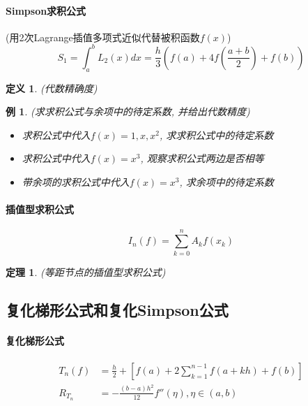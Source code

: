\documentclass[twoside]{article}
\newtheorem{theorem}{定理}[section]
\newtheorem{definition}{定义}[section]
\newtheorem{eg}{例}[section]
\begin{document}
\paragraph{Simpson求积公式}
(用2次Lagrange插值多项式近似代替被积函数$f(x)$)
\begin{equation}
  S_1 = \int^b_a L_2(x)dx = \frac{h}{3} \left(f(a) + 4f(\frac{a+b}{2}) + f(b) \right)
\end{equation}
\begin{definition}
  (代数精确度)
\end{definition}
\begin{eg}
  (求求积公式与余项中的待定系数, 并给出代数精度)
  \begin{itemize}
    \item 求积公式中代入$f(x)=1, x, x^2$, 求求积公式中的待定系数
    \item 求积公式中代入$f(x)=x^3$, 观察求积公式两边是否相等
    \item 带余项的求积公式中代入$f(x)=x^3$, 求余项中的待定系数
  \end{itemize}
\end{eg}
\paragraph{插值型求积公式}
\begin{equation}
  I_n(f) = \sum^n_{k=0} A_k f(x_k)
\end{equation}
\begin{theorem}
  (等距节点的插值型求积公式)
\end{theorem}
\subsection{复化梯形公式和复化Simpson公式}
\paragraph{复化梯形公式}
\begin{equation}
  \begin{aligned}
    T_n(f) &= \frac{h}{2} + \left[ f(a) + 2\sum^{n-1}_{k=1} f(a+kh) + f(b)  \right]\\
    R_{T_n} &= - \frac{(b-a)h^2}{12} f''(\eta), \eta\in(a,b)
  \end{aligned}
\end{equation}
\end{document}
